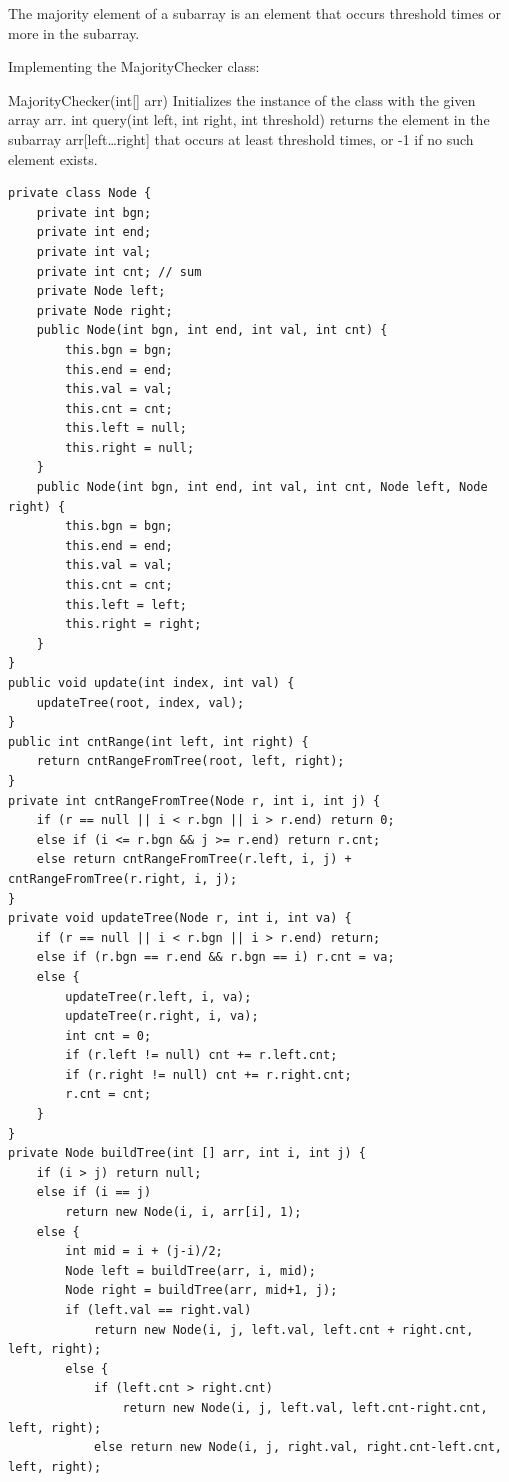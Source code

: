\documentclass[9pt, b5paaper]{book}
\begin{document}
The majority element of a subarray is an element that occurs threshold times or more in the subarray.

Implementing the MajorityChecker class:

MajorityChecker(int[] arr) Initializes the instance of the class with the given array arr.
int query(int left, int right, int threshold) returns the element in the subarray arr[left\ldots{}right] that occurs at least threshold times, or -1 if no such element exists.
\begin{verbatim}
private class Node {
    private int bgn;
    private int end;
    private int val;
    private int cnt; // sum
    private Node left;
    private Node right;
    public Node(int bgn, int end, int val, int cnt) {
        this.bgn = bgn;
        this.end = end;
        this.val = val;
        this.cnt = cnt;
        this.left = null;
        this.right = null;
    }
    public Node(int bgn, int end, int val, int cnt, Node left, Node right) {
        this.bgn = bgn;
        this.end = end;
        this.val = val;
        this.cnt = cnt;
        this.left = left;
        this.right = right;
    }
}
public void update(int index, int val) {
    updateTree(root, index, val);
}
public int cntRange(int left, int right) {
    return cntRangeFromTree(root, left, right);
}
private int cntRangeFromTree(Node r, int i, int j) {
    if (r == null || i < r.bgn || i > r.end) return 0;
    else if (i <= r.bgn && j >= r.end) return r.cnt;
    else return cntRangeFromTree(r.left, i, j) + cntRangeFromTree(r.right, i, j);
}
private void updateTree(Node r, int i, int va) {
    if (r == null || i < r.bgn || i > r.end) return;
    else if (r.bgn == r.end && r.bgn == i) r.cnt = va; 
    else {
        updateTree(r.left, i, va);
        updateTree(r.right, i, va);
        int cnt = 0;
        if (r.left != null) cnt += r.left.cnt;
        if (r.right != null) cnt += r.right.cnt;
        r.cnt = cnt;
    }
}
private Node buildTree(int [] arr, int i, int j) { 
    if (i > j) return null;
    else if (i == j)
        return new Node(i, i, arr[i], 1);
    else {
        int mid = i + (j-i)/2;
        Node left = buildTree(arr, i, mid);
        Node right = buildTree(arr, mid+1, j);
        if (left.val == right.val)
            return new Node(i, j, left.val, left.cnt + right.cnt, left, right);
        else {
            if (left.cnt > right.cnt)
                return new Node(i, j, left.val, left.cnt-right.cnt, left, right);
            else return new Node(i, j, right.val, right.cnt-left.cnt, left, right);

\end{verbatim}
\end{document}
